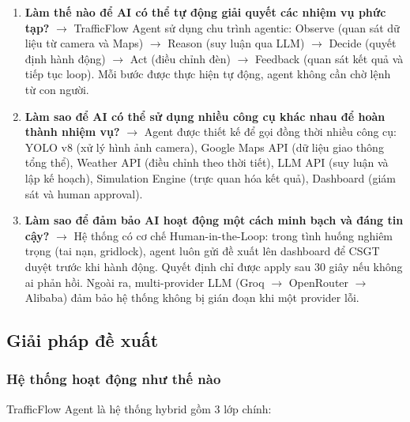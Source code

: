 \documentclass[12pt,a4paper]{article}
\begin{document}
\begin{enumerate}
    \item \textbf{Làm thế nào để AI có thể tự động giải quyết các nhiệm vụ phức tạp?} $\rightarrow$ TrafficFlow Agent sử dụng chu trình agentic: Observe (quan sát dữ liệu từ camera và Maps) $\rightarrow$ Reason (suy luận qua LLM) $\rightarrow$ Decide (quyết định hành động) $\rightarrow$ Act (điều chỉnh đèn) $\rightarrow$ Feedback (quan sát kết quả và tiếp tục loop). Mỗi bước được thực hiện tự động, agent không cần chờ lệnh từ con người.

    \item \textbf{Làm sao để AI có thể sử dụng nhiều công cụ khác nhau để hoàn thành nhiệm vụ?} $\rightarrow$ Agent được thiết kế để gọi đồng thời nhiều công cụ: YOLO v8 (xử lý hình ảnh camera), Google Maps API (dữ liệu giao thông tổng thể), Weather API (điều chỉnh theo thời tiết), LLM API (suy luận và lập kế hoạch), Simulation Engine (trực quan hóa kết quả), Dashboard (giám sát và human approval).

    \item \textbf{Làm sao để đảm bảo AI hoạt động một cách minh bạch và đáng tin cậy?} $\rightarrow$ Hệ thống có cơ chế Human-in-the-Loop: trong tình huống nghiêm trọng (tai nạn, gridlock), agent luôn gửi đề xuất lên dashboard để CSGT duyệt trước khi hành động. Quyết định chỉ được apply sau 30 giây nếu không ai phản hồi. Ngoài ra, multi-provider LLM (Groq $\rightarrow$ OpenRouter $\rightarrow$ Alibaba) đảm bảo hệ thống không bị gián đoạn khi một provider lỗi.
\end{enumerate}

\subsection{Giải pháp đề xuất}

\subsubsection{Hệ thống hoạt động như thế nào}

TrafficFlow Agent là hệ thống hybrid gồm 3 lớp chính:
\end{document}
